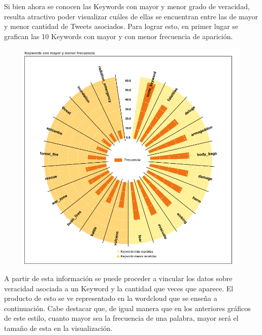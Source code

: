 \documentclass[titlepage,a4paper]{article}
\begin{document}
    Si bien ahora se conocen las Keywords con mayor y menor grado de veracidad, resulta atractivo poder visualizar cuáles de ellas se encuentran entre las de mayor y menor cantidad de Tweets asociados. Para lograr esto, en primer lugar se grafican las 10 Keywords con mayor y con menor frecuencia de aparición.
    \begin{figure}[H]
    \centering
    \includegraphics[width=1\textwidth]{graficos/Analisis de Keyword/rosquete_keywords_repetidas.png}
    \caption{} 
    \end{figure}
    
    A partir de esta información se puede proceder a vincular los datos sobre veracidad asociada a un Keyword y la cantidad que veces que aparece. El producto de esto se ve representado en la wordcloud que se enseña a continuación. Cabe destacar que, de igual manera que en los anteriores gráficos de este estilo, cuanto mayor sea la frecuencia de una palabra, mayor será el tamaño de esta en la visualización.
    
\end{document}
